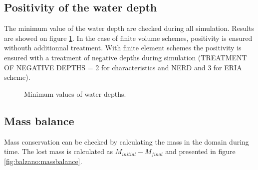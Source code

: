 


\subsection{Positivity of the water depth}

The minimum value of the water depth are checked during all simulation. 
Results are showed on figure \ref{t2d:balzano:minmax}. 
In the case of finite volume schemes, positivity is ensured withouth additionnal treatment.
With finite element schemes the positivity is ensured with a treatment of negative depths
during simulation (TREATMENT OF NEGATIVE DEPTHS = 2 for characteristics and NERD and 3 for ERIA scheme).

\begin{figure}[H]
\centering
{}
\caption{Minimum values of water depths.}
\label{t2d:balzano:minmax}
\end{figure}

\subsection{Mass balance}

Mass conservation can be checked by calculating the mass in the domain during time. The lost mass is calculated as 
$M_{initial} - M_{final}$ and presented in figure \ref{fig:balzano:massbalance}. 

